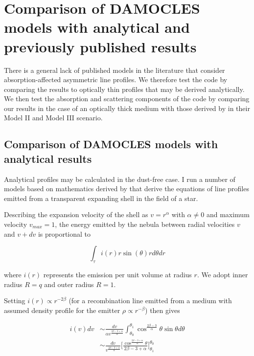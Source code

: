 \documentclass[useAMS,usenatbib,usegraphicx]{mnras}
\begin{document}


\section{Comparison of DAMOCLES models with analytical and previously published results}
\label{params}

There is a general lack of published models in the literature that 
consider absorption-affected asymmetric line profiles.  We therefore test 
the code by comparing the results to optically thin profiles that may be 
derived analytically.  We then test the absorption and scattering 
components of the code by comparing our results in the case of an 
optically thick medium with those derived by \citet{Lucy1989a} in their 
Model II and Model III scenario.

\subsection{Comparison of DAMOCLES models with analytical results}
\label{analytics}

Analytical profiles may be calculated in the dust-free case.  I run a 
number of models based on mathematics derived by \cite{Gerasimovic1933} 
that derive the equations of line profiles emitted from a transparent 
expanding shell in the field of a star.

Describing the expansion velocity of the shell as $v=r^\alpha$ with 
$\alpha \neq 0$ and maximum velocity $v_{max}=1$, the energy emitted by 
the nebula between radial velocities $v$ and $v+dv$ is proportional to

\begin{equation}
\int _\tau i(r) r \sin (\theta) r d\theta dr
\end{equation}

\noindent where $i(r)$ represents the emission per unit volume at radius 
$r$.  We adopt inner radius $R=q$ and outer radius $R=1$.

Setting $i(r) \propto r^{-2\beta}$ (for a recombination line emitted from 
a medium with assumed density profile for the emitter $\rho \propto 
r^{-\beta}$) then gives

\begin{equation}
\begin{split}
i(v)dv &\sim \frac{dv}{\alpha v^{\frac{2\beta-3+\alpha}{\alpha}}} \int^{\theta_1}_{\theta_0} \cos^{\frac{2\beta-3}{\alpha}} \theta \sin \theta d\theta 
\\
&\sim  \frac{dv}{v^{\frac{2\beta-3+\alpha}{\alpha}}} \Bigg[\frac{\cos^{\frac{2\beta - 3 + \alpha}{\alpha}} \theta}{2\beta -3 + \alpha}\Bigg]^{\theta_0}_{\theta_1}
\end{split}
\end{equation}
\end{document}
